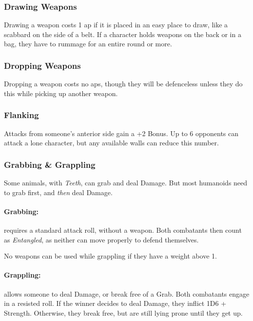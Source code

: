 \begin{multicols}{2}
\subsubsection[Drawing Weapon -- Cost: 1 \glsentrytext{ap}]{Drawing Weapons}

Drawing a weapon costs 1 \gls{ap} if it is placed in an easy place to draw, like a scabbard on the side of a belt.
If a character holds weapons on the back or in a bag, they have to rummage for an entire round or more.

\subsubsection[Dropping Weapon -- Cost: 0 \gls{ap}]{Dropping Weapons}

Dropping a weapon costs no \glspl{ap}, though they will be defenceless unless they do this while picking up another weapon.


\subsubsection[Flanking: Gain +2 to attack]{Flanking}\label{flank}

Attacks from someone's anterior side gain a +2 Bonus.
Up to 6 opponents can attack a lone character, but any available walls can reduce this number.

\subsubsection{Grabbing \& Grappling}
\label{grappling}
Some animals, with \textit{Teeth}, can grab and deal Damage.
But most humanoids need to grab first, and \emph{then} deal Damage.

\paragraph[Grabs: Make an attack without any weapon bonus. Both combatants are \textit{Entangled}. Cost: 1 \gls{ap}]{Grabbing:}
requires a standard attack roll, without a weapon.
Both combatants then count as \textit{Entangled}, as neither can move properly to defend themselves.
\label{grab}

No weapons can be used while grappling if they have a \gls{weight} above 1.

\paragraph[Grapple: Make an opposted roll of Strength + Combat.  Success means the combatant can either break free or inflict Damage.  Cost: 3 \gls{ap}]{Grappling:}
allows someone to deal Damage, or break free of a Grab.
Both combatants engage in a resisted  roll.
If the winner decides to deal Damage, they inflict 1D6 + Strength.
Otherwise, they break free, but are still lying prone until they get up.
\label{grapple}


\end{multicols}
